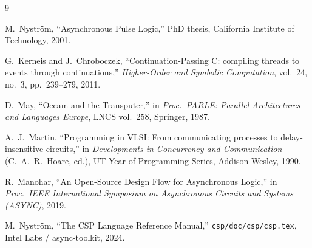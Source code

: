 \documentclass[11pt,letterpaper]{article}
\begin{document}
\begin{thebibliography}{9}

  M.~Nystr\"om,
  ``Asynchronous Pulse Logic,''
  PhD thesis, California Institute of Technology, 2001.

  G.~Kerneis and J.~Chroboczek,
  ``Continuation-Passing C: compiling threads to events through
  continuations,''
  \emph{Higher-Order and Symbolic Computation}, vol.~24, no.~3,
  pp.~239--279, 2011.

  D.~May,
  ``Occam and the Transputer,''
  in \emph{Proc.\ PARLE: Parallel Architectures and Languages
  Europe}, LNCS vol.~258, Springer, 1987.

  A.~J.~Martin,
  ``Programming in VLSI: From communicating processes to
  delay-insensitive circuits,''
  in \emph{Developments in Concurrency and Communication}
  (C.~A.~R.~Hoare, ed.), UT Year of Programming Series,
  Addison-Wesley, 1990.

  R.~Manohar,
  ``An Open-Source Design Flow for Asynchronous Logic,''
  in \emph{Proc.\ IEEE International Symposium on Asynchronous
  Circuits and Systems (ASYNC)}, 2019.

  M.~Nystr\"om,
  ``The CSP Language Reference Manual,''
  \texttt{csp/doc/csp/csp.tex}, Intel Labs / async-toolkit, 2024.

\end{thebibliography}
\end{document}
